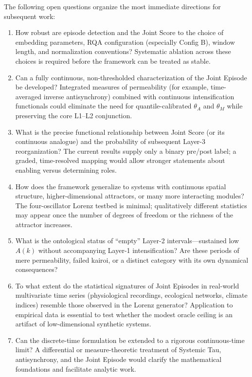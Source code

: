 The following open questions organize the most immediate directions for subsequent work:

\begin{enumerate}
    \item How robust are episode detection and the Joint Score to the choice of embedding parameters, RQA configuration (especially Config B), window length, and normalization conventions? Systematic ablation across these choices is required before the framework can be treated as stable.

    \item Can a fully continuous, non-thresholded characterization of the Joint Episode be developed? Integrated measures of permeability (for example, time-averaged inverse antisynchrony) combined with continuous intensification functionals could eliminate the need for quantile-calibrated $\theta_A$ and $\theta_M$ while preserving the core L1--L2 conjunction.

    \item What is the precise functional relationship between Joint Score (or its continuous analogue) and the probability of subsequent Layer-3 reorganization? The current results supply only a binary pre/post label; a graded, time-resolved mapping would allow stronger statements about enabling versus determining roles.

    \item How does the framework generalize to systems with continuous spatial structure, higher-dimensional attractors, or many more interacting modules? The four-oscillator Lorenz testbed is minimal; qualitatively different statistics may appear once the number of degrees of freedom or the richness of the attractor increases.

    \item What is the ontological status of ``empty'' Layer-2 intervals---sustained low $A(k)$ without accompanying Layer-1 intensification? Are these periods of mere permeability, failed kairoi, or a distinct category with its own dynamical consequences?

    \item To what extent do the statistical signatures of Joint Episodes in real-world multivariate time series (physiological recordings, ecological networks, climate indices) resemble those observed in the Lorenz generator? Application to empirical data is essential to test whether the modest oracle ceiling is an artifact of low-dimensional synthetic systems.

    \item Can the discrete-time formulation be extended to a rigorous continuous-time limit? A differential or measure-theoretic treatment of Systemic Tau, antisynchrony, and the Joint Episode would clarify the mathematical foundations and facilitate analytic work.


\end{enumerate}
